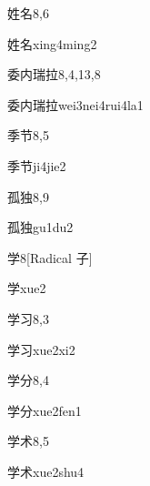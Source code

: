 \begin{entry}{姓名}{8,6}
  \begin{phonetics}{姓名}{xing4ming2}
  \end{phonetics}
\end{entry}

\begin{entry}{委内瑞拉}{8,4,13,8}
  \begin{phonetics}{委内瑞拉}{wei3nei4rui4la1}
  \end{phonetics}
\end{entry}

\begin{entry}{季节}{8,5}
  \begin{phonetics}{季节}{ji4jie2}
  \end{phonetics}
\end{entry}

\begin{entry}{孤独}{8,9}
  \begin{phonetics}{孤独}{gu1du2}
  \end{phonetics}
\end{entry}

\begin{entry}{学}{8}[Radical 子]
  \begin{phonetics}{学}{xue2}
  \end{phonetics}
\end{entry}

\begin{entry}{学习}{8,3}
  \begin{phonetics}{学习}{xue2xi2}
  \end{phonetics}
\end{entry}

\begin{entry}{学分}{8,4}
  \begin{phonetics}{学分}{xue2fen1}
  \end{phonetics}
\end{entry}

\begin{entry}{学术}{8,5}
  \begin{phonetics}{学术}{xue2shu4}
  \end{phonetics}
\end{entry}

